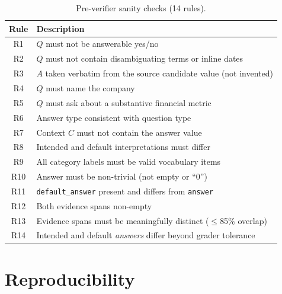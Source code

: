 \begin{table}[h]
\centering
\caption{Pre-verifier sanity checks (14 rules).}
\label{tab:qc}
\small
\begin{tabular}{cp{}}
\toprule
Rule & Description \\
\midrule
R1  & $Q$ must not be answerable yes/no \\
R2  & $Q$ must not contain disambiguating terms or inline dates \\
R3  & $A$ taken verbatim from the source candidate value (not invented) \\
R4  & $Q$ must name the company \\
R5  & $Q$ must ask about a substantive financial metric \\
R6  & Answer type consistent with question type \\
R7  & Context $C$ must not contain the answer value \\
R8  & Intended and default interpretations must differ \\
R9  & All category labels must be valid vocabulary items \\
R10 & Answer must be non-trivial (not empty or ``0'') \\
R11 & \texttt{default\_answer} present and differs from \texttt{answer} \\
R12 & Both evidence spans non-empty \\
R13 & Evidence spans must be meaningfully distinct ($\leq$85\% overlap) \\
R14 & Intended and default \emph{answers} differ beyond grader tolerance \\
\bottomrule
\end{tabular}
\end{table}


\section{Reproducibility}
\label{app:repro}

